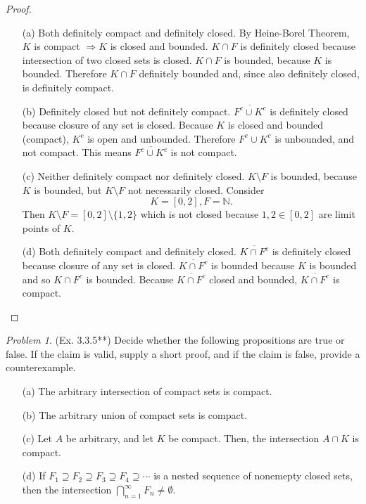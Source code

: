 \documentclass[11pt,twoside, reqno]{amsart}
\theoremstyle{remark}
\newtheorem{Prob}{Problem}
\def\N{\mathbb N}
\renewcommand{\implies}{\Rightarrow}
\begin{document}
\begin{proof}
\begin{enumerate}
    \item [(a)] Both definitely compact and definitely closed. By Heine-Borel Theorem, $K$ is compact $\implies K$ is closed and bounded. $K \cap F$ is definitely closed because intersection of two closed sets is closed. $K \cap F$ is bounded, because $K$ is bounded. Therefore $K \cap F$ definitely bounded and, since also definitely closed, is definitely compact.
    \item [(b)] Definitely closed but not definitely compact. $\overline{{F^c \cup K^c}}$ is definitely closed because closure of any set is closed. Because $K$ is closed and bounded (compact), $K^c$ is open and unbounded. Therefore $F^c \cup K^c$ is unbounded, and not compact. This means $\overline{F^c \cup K^c}$ is not compact.
    \item [(c)] Neither definitely compact nor definitely closed. $K \setminus F$ is bounded, because $K$ is bounded, but $K \setminus F$ not necessarily closed. Consider
    $$
        K = [0,2], F = \N.
    $$
    Then $K \setminus F = [0,2] \setminus \{1,2\}$ which is not closed because $1,2 \in [0,2]$ are limit points of $K$.
    \item [(d)] Both definitely compact and definitely closed. $\overline{K \cap F^c}$ is definitely closed because closure of any set is closed. $\overline{K \cap F^c}$ is bounded because $K$ is bounded and so $K \cap F^c$ is bounded. Because $\overline{K \cap F^c}$ closed and bounded, $\overline{K \cap F^c}$ is compact.
\end{enumerate}

\end{proof}

\begin{Prob}(Ex. 3.3.5**) Decide whether the following propositions are true or false. If the claim is valid, supply a short proof, and if the claim is false, provide a counterexample.
\begin{enumerate}
    \item [(a)] The arbitrary intersection of compact sets is compact.
    \item [(b)] The arbitrary union of compact sets is compact.
    \item [(c)] Let $A$ be arbitrary, and let $K$ be compact. Then, the intersection $A \cap K$ is compact.
    \item [(d)] If $F_1 \supseteq F_2 \supseteq F_3 \supseteq F_4 \supseteq \cdots$ is a nested sequence of nonemepty closed sets, then the intersection $\bigcap^\infty_{n=1}F_n \neq \emptyset$.
\end{enumerate}
\end{Prob}
\end{document}
